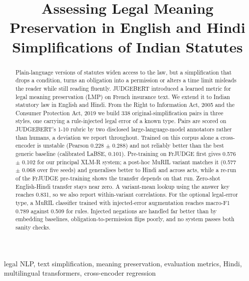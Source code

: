\documentclass[conference]{IEEEtran}
\begin{document}
\title{Assessing Legal Meaning Preservation in English and Hindi Simplifications of Indian Statutes}
\author{}
\maketitle
\begin{abstract}
Plain-language versions of statutes widen access to the law, but a simplification that drops a condition, turns an obligation into a permission or alters a time limit misleads the reader while still reading fluently. JUDGEBERT introduced a learned metric for legal meaning preservation (LMP) on French insurance text. We extend it to Indian statutory law in English and Hindi. From the Right to Information Act, 2005 and the Consumer Protection Act, 2019 we build 338 original-simplification pairs in three styles, one carrying a rule-injected legal error of a known type. Pairs are scored on JUDGEBERT's 1-10 rubric by two disclosed large-language-model annotators rather than humans, a deviation we report throughout. Trained on this corpus alone a cross-encoder is unstable (Pearson 0.228 \ensuremath{\pm} 0.288) and not reliably better than the best generic baseline (calibrated LaBSE, 0.101). Pre-training on FrJUDGE first gives 0.576 \ensuremath{\pm} 0.102 for our principal XLM-R system; a post-hoc MuRIL variant matches it (0.577 \ensuremath{\pm} 0.068 over five seeds) and generalises better to Hindi and across acts, while a re-run of the FrJUDGE pre-training shows the transfer depends on that run. Zero-shot English-Hindi transfer stays near zero. A variant-mean lookup using the answer key reaches 0.831, so we also report within-variant correlations. For the optional legal-error type, a MuRIL classifier trained with injected-error augmentation reaches macro-F1 0.789 against 0.509 for rules. Injected negations are handled far better than by embedding baselines, obligation-to-permission flips poorly, and no system passes both sanity checks.
\end{abstract}
\begin{IEEEkeywords}
legal NLP, text simplification, meaning preservation, evaluation metrics, Hindi, multilingual transformers, cross-encoder regression
\end{IEEEkeywords}
\end{document}
